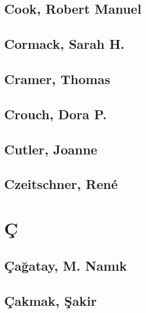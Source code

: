 
\subsection[Cook, Robert Manuel (1)]{Cook, Robert Manuel}

\subsection[Cormack, Sarah H. (1)]{Cormack, Sarah H.}

\subsection[Cramer, Thomas (1)]{Cramer, Thomas}

\subsection[Crouch, Dora P. (1)]{Crouch, Dora P.}

\subsection[Cutler, Joanne (1)]{Cutler, Joanne}

\subsection[Czeitschner, René (1)]{Czeitschner, René}

\section{Ç}

\subsection[Çağatay, M. Namık (1)]{Çağatay, M. Namık}

\subsection[Çakmak, Şakir (3)]{Çakmak, Şakir}

